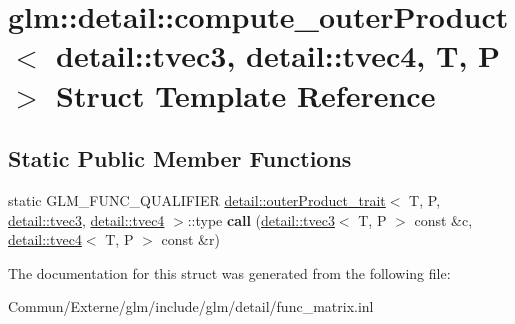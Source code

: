 \hypertarget{structglm_1_1detail_1_1compute__outer_product_3_01detail_1_1tvec3_00_01detail_1_1tvec4_00_01_t_00_01_p_01_4}{}\section{glm\+:\+:detail\+:\+:compute\+\_\+outer\+Product$<$ detail\+:\+:tvec3, detail\+:\+:tvec4, T, P $>$ Struct Template Reference}
\label{structglm_1_1detail_1_1compute__outer_product_3_01detail_1_1tvec3_00_01detail_1_1tvec4_00_01_t_00_01_p_01_4}
\subsection*{Static Public Member Functions}
\begin{DoxyCompactItemize}
\item 
static G\+L\+M\+\_\+\+F\+U\+N\+C\+\_\+\+Q\+U\+A\+L\+I\+F\+I\+ER \hyperlink{structglm_1_1detail_1_1outer_product__trait}{detail\+::outer\+Product\+\_\+trait}$<$ T, P, \hyperlink{structglm_1_1detail_1_1tvec3}{detail\+::tvec3}, \hyperlink{structglm_1_1detail_1_1tvec4}{detail\+::tvec4} $>$\+::type {\bfseries call} (\hyperlink{structglm_1_1detail_1_1tvec3}{detail\+::tvec3}$<$ T, P $>$ const \&c, \hyperlink{structglm_1_1detail_1_1tvec4}{detail\+::tvec4}$<$ T, P $>$ const \&r)\hypertarget{structglm_1_1detail_1_1compute__outer_product_3_01detail_1_1tvec3_00_01detail_1_1tvec4_00_01_t_00_01_p_01_4_a449658ffb9f411b13c9942e68b9ad60b}{}\label{structglm_1_1detail_1_1compute__outer_product_3_01detail_1_1tvec3_00_01detail_1_1tvec4_00_01_t_00_01_p_01_4_a449658ffb9f411b13c9942e68b9ad60b}

\end{DoxyCompactItemize}


The documentation for this struct was generated from the following file\+:\begin{DoxyCompactItemize}
\item 
Commun/\+Externe/glm/include/glm/detail/func\+\_\+matrix.\+inl\end{DoxyCompactItemize}
